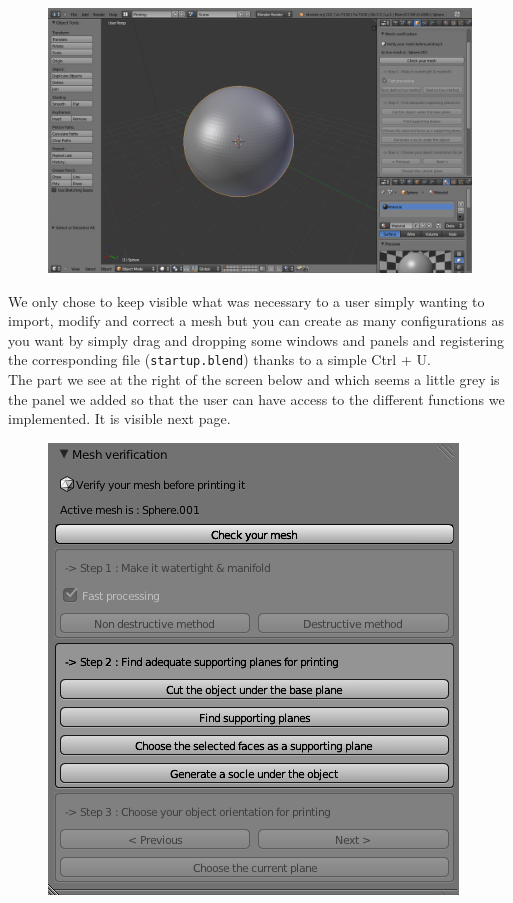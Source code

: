 \documentclass{article}
\begin{document}
\begin{figure}[!h]
\begin{center}
	\includegraphics[scale=0.3]{./Images/NotreInterface}
\end{center}
\end{figure}

\bigskip
\bigskip

We only chose to keep visible what was necessary to a user simply wanting to import, modify and correct a mesh but you can create as many configurations as you want by simply drag and dropping some windows and panels and registering the corresponding file (\texttt{startup.blend}) thanks to a simple Ctrl + U.\\

The part we see at the right of the screen below and which seems a little grey is the panel we added so that the user can have access to the different functions we implemented. It is visible next page.

\newpage

\bigskip
\begin{figure}[!h]
\begin{center}
	\includegraphics[scale=0.8]{./Images/Panel}
\end{center}
\end{figure}
\bigskip
\end{document}
